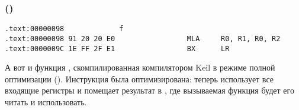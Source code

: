 ﻿\subsubsection{\OptimizingKeilVI (\ARMMode)}

\begin{lstlisting}[label=ARM_leaf_example1]
.text:00000098             f
.text:00000098 91 20 20 E0                 MLA     R0, R1, R0, R2
.text:0000009C 1E FF 2F E1                 BX      LR
\end{lstlisting}

А вот и функция \ttf, скомпилированная компилятором Keil в режиме полной оптимизации (\Othree).
Инструкция \MOV была оптимизирована: теперь  использует все входящие регистры 
и помещает результат в , где вызываемая функция будет его читать и использовать.

